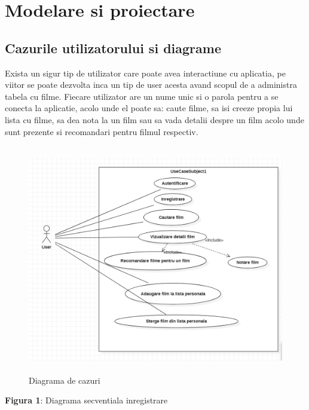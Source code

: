 \chapter{Modelare si proiectare}

\section{Cazurile utilizatorului si diagrame}
\label{sec:ch3sec1}
 \par Exista un sigur tip de utilizator care poate avea interactiune cu aplicatia, pe viitor se poate dezvolta inca un tip de user acesta avand scopul de a administra tabela cu filme. Fiecare utilizator are un nume unic si o parola pentru a se conecta la aplicatie, acolo unde el poate sa: caute filme, sa isi creeze propia lui lista cu filme, sa dea nota la un film sau sa vada detalii despre un film acolo unde sunt prezente si recomandari pentru filmul respectiv.
		\begin{figure}[htbp]
			\centerline{\includegraphics[width=13cm, height=10cm]{figures/use case.png}}
			\caption{Diagrama de cazuri}
			\label{fig}
		\end{figure}
\newline
\newline
\par \textbf{Figura 1}: Diagrama secventiala inregistrare
